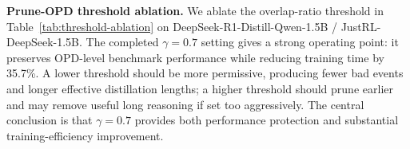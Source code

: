\noindent\textbf{Prune-OPD threshold ablation.}
We ablate the overlap-ratio threshold in Table~\ref{tab:threshold-ablation} on DeepSeek-R1-Distill-Qwen-1.5B / JustRL-DeepSeek-1.5B.
The completed $\gamma=0.7$ setting gives a strong operating point: it preserves OPD-level benchmark performance while reducing training time by 35.7\%.
A lower threshold should be more permissive, producing fewer bad events and longer effective distillation lengths; a higher threshold should prune earlier and may remove useful long reasoning if set too aggressively.
The central conclusion is that $\gamma=0.7$ provides both performance protection and substantial training-efficiency improvement.
